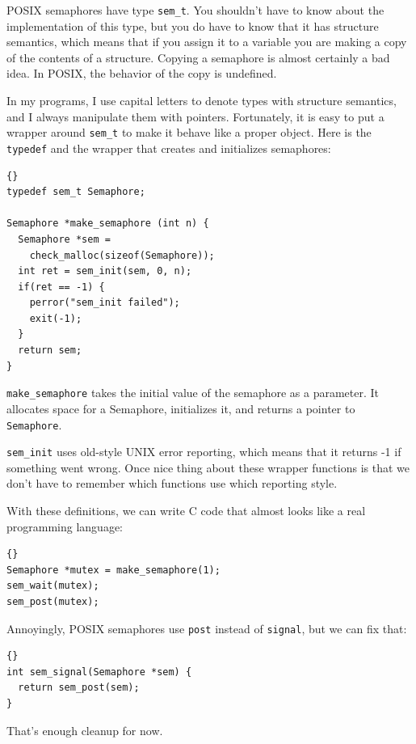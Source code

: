 \documentclass{book}
\begin{document}
POSIX semaphores have type {\tt sem\_t}.  You shouldn't have
to know about the implementation of this type, but you do
have to know that it has structure semantics, which means that
if you assign it to a variable you are making a copy of the
contents of a structure.  Copying a semaphore is almost certainly
a bad idea.  In POSIX, the behavior of the copy is undefined.

In my programs, I use capital letters to denote types with structure semantics, and I always manipulate them with pointers. Fortunately, it is easy to put a wrapper around {\tt sem\_t} to make it behave like a proper object.  Here is the {\tt typedef} and the wrapper that creates and initializes semaphores:

\begin{lstlisting}[title={}]{}
typedef sem_t Semaphore;

Semaphore *make_semaphore (int n) {
  Semaphore *sem = 
    check_malloc(sizeof(Semaphore));
  int ret = sem_init(sem, 0, n);
  if(ret == -1) {
    perror("sem_init failed");
    exit(-1);    
  }
  return sem;
}
\end{lstlisting}

{\tt make\_semaphore} takes the initial value of the semaphore
as a parameter.  It allocates space for a Semaphore, initializes
it, and returns a pointer to {\tt Semaphore}.

{\tt sem\_init} uses old-style UNIX error reporting, which means
that it returns -1 if something went wrong.  Once nice thing
about these wrapper functions is that we don't have to remember
which functions use which reporting style.

With these definitions, we can write C code that almost looks
like a real programming language:

\begin{lstlisting}[title={}]{}
Semaphore *mutex = make_semaphore(1);
sem_wait(mutex);
sem_post(mutex);
\end{lstlisting}

Annoyingly, POSIX semaphores use {\tt post} instead of
    {\tt signal}, but we can fix that:

\begin{lstlisting}[title={}]{}
int sem_signal(Semaphore *sem) {
  return sem_post(sem);
}
\end{lstlisting}

That's enough cleanup for now.
\end{document}
